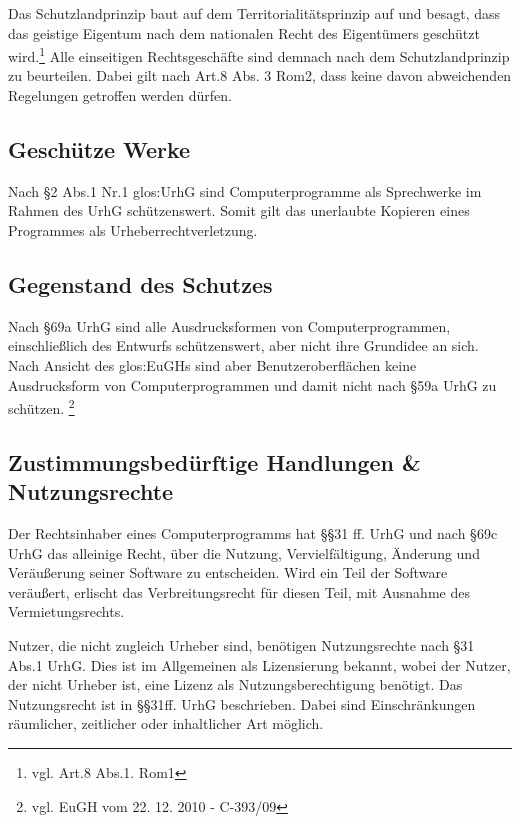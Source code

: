 Das Schutzlandprinzip baut auf dem Territorialit\"atsprinzip auf und besagt, dass das geistige Eigentum nach dem nationalen Recht des Eigent\"umers gesch\"utzt wird.\footnote{vgl. Art.8 Abs.1. Rom1} Alle einseitigen Rechtsgesch\"afte sind demnach nach dem Schutzlandprinzip zu beurteilen. Dabei gilt nach Art.8 Abs. 3 Rom2, dass keine davon abweichenden Regelungen getroffen werden d\"urfen.    
   \label{territorialitaets_u_schutzlandprinzip}

\subsection{Gesch\"utze Werke}
Nach §2 Abs.1 Nr.1 \gls{glos:UrhG} sind Computerprogramme als Sprechwerke im Rahmen des UrhG sch\"utzenswert. Somit gilt das unerlaubte Kopieren eines Programmes als Urheberrechtverletzung.
   \label{geschuetzte_werke}

\subsection{Gegenstand des Schutzes}
Nach §69a UrhG sind alle Ausdrucksformen von Computerprogrammen, einschlie{\ss}lich des Entwurfs sch\"utzenswert, aber nicht ihre Grundidee an sich. Nach Ansicht des \gls{glos:EuGH}s sind aber Benutzeroberfl\"achen keine Ausdrucksform von Computerprogrammen und damit nicht nach §59a UrhG zu sch\"utzen. \footnote{vgl. EuGH vom 22. 12. 2010 - C-393/09}
  \label{gegenstand_des_schutzes}

\subsection{Zustimmungsbed\"urftige Handlungen \& Nutzungsrechte}
Der Rechtsinhaber eines Computerprogramms hat §§31 ff. UrhG und nach §69c UrhG das alleinige Recht, \"uber die Nutzung, Vervielf\"altigung, \"Anderung und Ver\"au{\ss}erung seiner Software zu entscheiden. Wird ein Teil der Software ver\"au{\ss}ert, erlischt das Verbreitungsrecht f\"ur diesen Teil, mit Ausnahme des Vermietungsrechts.\newline

Nutzer, die nicht zugleich Urheber sind, ben\"otigen Nutzungsrechte nach §31 Abs.1 UrhG. Dies ist im Allgemeinen als Lizensierung bekannt, wobei der Nutzer, der nicht Urheber ist, eine Lizenz als Nutzungsberechtigung ben\"otigt. Das Nutzungsrecht ist in §§31ff. UrhG beschrieben. Dabei sind Einschr\"ankungen r\"aumlicher, zeitlicher oder inhaltlicher Art m\"oglich. 
 \label{zustimmungsbeduerftige_handlungen_nutzungsrechte}

